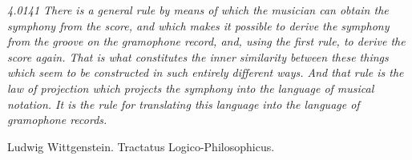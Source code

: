 \vspace*{15.0 cm}

\textit{4.0141 There is a general rule by means of which the musician can obtain the symphony from the score, and which makes it possible to derive the symphony from the groove on the gramophone record, and, using the first rule, to derive the score again. That is what constitutes the inner similarity between these things which seem to be constructed in such entirely different ways. And that rule is the law of projection which projects the symphony into the language of musical notation. It is the rule for translating this language into the language of gramophone records.}

\begin{flushright}
Ludwig Wittgenstein. Tractatus Logico-Philosophicus.
\end{flushright}

\iffalse
\vspace*{14.0 cm}

\noindent\textit{Dear Moore,}

\indent\textit{Your letter annoyed me. When I wrote Logik I didn't consult the Regulations, and therefore I think it would only be fair if you gave me my degree without consulting them so much either! As to a Preface and Notes; I think my examiners will easily see how much I have cribbed from Bosanquet. - If I'm not worth your making an exception for me even in some STUPID details then I may as well go to Hell directly; and if I am worth it and you don't do it then - by God - you might go there.}

\indent\textit{The whole business is too beastly to go on writing about it so -}

\noindent\textit{L.W.}

\begin{flushright}
(Carta de Ludwig Wittgenstein a George Moore)
\end{flushright}
\fi